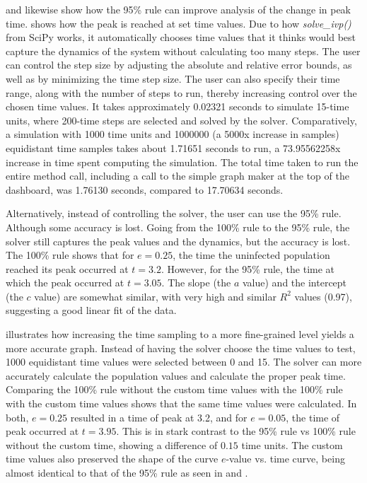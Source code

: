  and  likewise show how the 95\% rule can improve analysis of the change in peak time. 
 shows how the peak is reached at set time values. 
Due to how \textit{solve\_ivp()} from SciPy works, it automatically chooses time values that it thinks would best capture the dynamics of the system without calculating too many steps. 
The user can control the step size by adjusting the absolute and relative error bounds, as well as by minimizing the time step size. 
The user can also specify their time range, along with the number of steps to run, thereby increasing control over the chosen time values. 
It takes approximately 0.02321 seconds to simulate 15-time units, where 200-time steps are selected and solved by the solver. 
Comparatively, a simulation with 1000 time units and 1000000 (a 5000x increase in samples) equidistant time samples takes about 1.71651 seconds to run, a 73.95562258x increase in time spent computing the simulation. 
The total time taken to run the entire method call, including a call to the simple graph maker at the top of the dashboard, was 1.76130 seconds, compared to 17.70634 seconds. 

Alternatively, instead of controlling the solver, the user can use the 95\% rule.
Although some accuracy is lost. 
Going from the 100\% rule to the 95\% rule, the solver still captures the peak values and the dynamics, but the accuracy is lost. 
The 100\% rule shows that for $e=0.25$, the time the uninfected population reached its peak occurred at $t=3.2$. 
However, for the 95\% rule, the time at which the peak occurred at $t=3.05$. 
The slope (the $a$ value) and the intercept (the $c$ value) are somewhat similar, with very high and similar $R^2$ values (0.97), suggesting a good linear fit of the data. 

 illustrates how increasing the time sampling to a more fine-grained level yields a more accurate graph. 
Instead of having the solver choose the time values to test, 1000 equidistant time values were selected between 0 and 15. 
The solver can more accurately calculate the population values and calculate the proper peak time. 
Comparing the 100\% rule without the custom time values with the 100\% rule with the custom time values shows that the same time values were calculated. 
In both, $e=0.25$ resulted in a time of peak at 3.2, and for $e=0.05$, the time of peak occurred at $t=3.95$. 
This is in stark contrast to the 95\% rule vs 100\% rule without the custom time, showing a difference of $0.15$ time units. 
The custom time values also preserved the shape of the curve $e$-value vs. time curve, being almost identical to that of the 95\% rule as seen in  and . 

